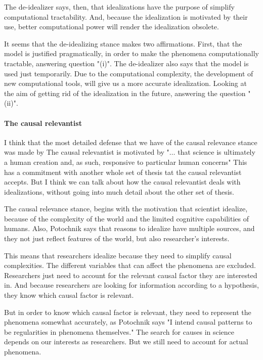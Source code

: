 {{The de-idealizer says, then, that idealizations have the purpose of simplify computational tractability.
And, because the idealization is motivated by their use, better computational power will render the idealization obsolete.

It seems that the de-idealizing stance makes two affirmations.
First, that the model is justified pragmatically, in order to make the phenomena computationally tractable, answering question "(i)".
The de-idealizer also says that the model is used just temporarily.
Due to the computational complexity, the development of new computational tools, will give us a more accurate idealization.
Looking at the aim of getting rid of the idealization in the future, answering the question "(ii)".

\paragraph{The causal relevantist}

I think that the most detailed defense that we have of the causal relevance stance was made by%
The causal relevantist is motivated by "$\ldots$ that science is ultimately a human creation and, as such, responsive to particular human concerns" %
This has a commitment with another whole set of thesis tat the causal relevantist accepts.
But I think we can talk about how the causal relevantist deals with idealizations, without going into much detail about the other set of thesis.

The causal relevance stance, begins with the motivation that scientist idealize, because of the complexity of the world and the limited cognitive capabilities of humans.
Also, Potochnik says that reasons to idealize have multiple sources, and they not just reflect features of the world, but also researcher's interests.

This means that researchers idealize because they need to simplify causal complexities.
The different variables that can affect the phenomena are excluded.
Researchers just need to account for the relevant causal factor they are interested in.
And because researchers are looking for information according to a hypothesis, they know which causal factor is relevant.

But in order to know which causal factor is relevant, they need to represent the phenomena somewhat accurately, as Potochnik says "I intend causal patterns to be regularities in phenomena themselves." %
The search for causes in science depends on our interests as researchers.
But we still need to account for actual phenomena.

}}
